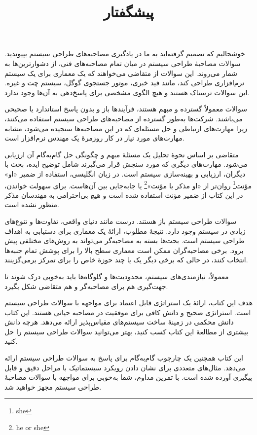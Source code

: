 \documentclass[12pt,a4paper]{article}
\title{پیشگفتار}
\author{}
\date{}
\begin{document}
\maketitle

خوشحالیم که تصمیم گرفته‌اید به ما در یادگیری مصاحبه‌های طراحی سیستم بپیوندید. سوالات مصاحبهٔ طراحی سیستم در میان تمام مصاحبه‌های فنی، از دشوارترین‌ها به شمار می‌روند. این سوالات از متقاضی می‌خواهند که یک معماری برای یک سیستم نرم‌افزاری طراحی کند، مانند فید خبری، موتور جستجوی گوگل، سیستم چت و غیره. این سوالات ترسناک هستند و هیچ الگوی مشخصی برای پاسخ‌دهی به آن‌ها وجود ندارد.

سوالات معمولاً گسترده و مبهم هستند، فرآیندها باز و بدون پاسخ استاندارد یا صحیحی می‌باشند. شرکت‌ها به‌طور گسترده از مصاحبه‌های طراحی سیستم استفاده می‌کنند، زیرا مهارت‌های ارتباطی و حل مسئله‌ای که در این مصاحبه‌ها سنجیده می‌شود، مشابه مهارت‌های مورد نیاز در کار روزمرهٔ یک مهندس نرم‌افزار است.

متقاضی بر اساس نحوهٔ تحلیل یک مسئلهٔ مبهم و چگونگی حل گام‌به‌گام آن ارزیابی می‌شود. مهارت‌های دیگری که مورد سنجش قرار می‌گیرند شامل توضیح ایده، بحث با دیگران، ارزیابی و بهینه‌سازی سیستم است. در زبان انگلیسی، استفاده از ضمیر «او» مؤنث\footnote{she} روان‌تر از «او مذکر یا مؤنث»\footnote{he or she} یا جابه‌جایی بین آن‌هاست. برای سهولت خواندن، در این کتاب از ضمیر مؤنث استفاده شده است و هیچ بی‌احترامی به مهندسان مذکر منظور نشده است.

سوالات طراحی سیستم باز هستند. درست مانند دنیای واقعی، تفاوت‌ها و تنوع‌های زیادی در سیستم وجود دارد. نتیجهٔ مطلوب، ارائهٔ یک معماری برای دستیابی به اهداف طراحی سیستم است. بحث‌ها بسته به مصاحبه‌گر می‌تواند به روش‌های مختلفی پیش برود. برخی مصاحبه‌گران ممکن است معماری سطح بالا را برای پوشش تمام جنبه‌ها انتخاب کنند، در حالی که برخی دیگر یک یا چند حوزهٔ خاص را برای تمرکز برمی‌گزینند.

معمولاً، نیازمندی‌های سیستم، محدودیت‌ها و گلوگاه‌ها باید به‌خوبی درک شوند تا جهت‌گیری هم برای مصاحبه‌گر و هم متقاضی شکل بگیرد.

هدف این کتاب، ارائهٔ یک استراتژی قابل اعتماد برای مواجهه با سوالات طراحی سیستم است. استراتژی صحیح و دانش کافی برای موفقیت در مصاحبه حیاتی هستند. این کتاب دانش محکمی در زمینهٔ ساخت سیستم‌های مقیاس‌پذیر ارائه می‌دهد. هرچه دانش بیشتری از مطالعهٔ این کتاب کسب کنید، بهتر می‌توانید سوالات طراحی سیستم را حل کنید.

این کتاب همچنین یک چارچوب گام‌به‌گام برای پاسخ به سوالات طراحی سیستم ارائه می‌دهد. مثال‌های متعددی برای نشان دادن رویکرد سیستماتیک با مراحل دقیق و قابل پیگیری آورده شده است. با تمرین مداوم، شما به‌خوبی برای مواجهه با سوالات مصاحبهٔ طراحی سیستم مجهز خواهید شد.
\end{document}
